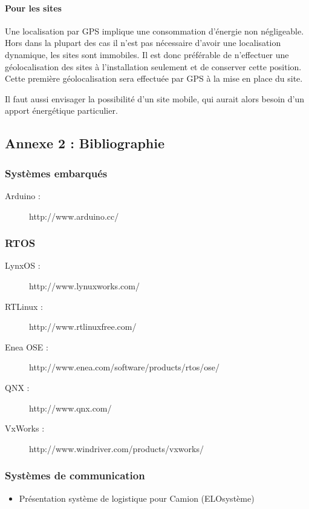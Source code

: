 \documentclass{article}
\begin{document}
\paragraph{Pour les sites}
Une localisation par GPS implique une consommation d’énergie non
négligeable. Hors dans la plupart des cas il n’est pas nécessaire
d’avoir une localisation dynamique, les sites sont immobiles. Il est
donc préférable de n’effectuer une géolocalisation des sites à
l’installation seulement et de conserver cette position. Cette première
géolocalisation sera effectuée par GPS à la mise en place du site.

Il faut aussi envisager la possibilité d’un site mobile, qui aurait
alors besoin d’un apport énergétique particulier.


\subsection{Annexe 2 : Bibliographie}
\subsubsection{Systèmes embarqués}
\begin{description}
\item[Arduino :] http://www.arduino.cc/
\end{description}
\subsubsection{RTOS}
\begin{description}
\item[LynxOS :] http://www.lynuxworks.com/
\item[RTLinux :] http://www.rtlinuxfree.com/
\item[Enea OSE :] http://www.enea.com/software/products/rtos/ose/
\item[QNX :] http://www.qnx.com/
\item[VxWorks :] http://www.windriver.com/products/vxworks/
\end{description}

\subsubsection{Systèmes de communication}
\begin{itemize}
\item Présentation système de logistique pour Camion (ELOsystème)
\end{itemize}
\end{document}
